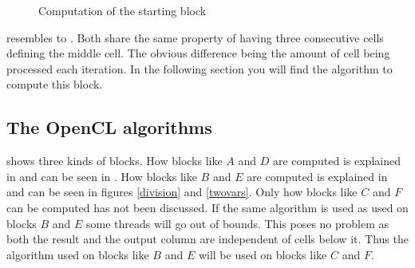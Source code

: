 \begin{figure}
    \centering
    
    \caption{Computation of the starting block} \label{start}
\end{figure}

 resembles to .
Both share the same property of having three consecutive cells defining the middle cell.
The obvious difference being the amount of cell being processed each iteration.
In the following section you will find the algorithm to compute this block.

\subsection{The OpenCL algorithms} \label{algorithms}
 shows three kinds of blocks.
How blocks like $A$ and $D$ are computed is explained in  and can be seen in .
How blocks like $B$ and $E$ are computed is explained in  and can be seen in figures \ref{division} and \ref{twovars}.
Only how blocks like $C$ and $F$ can be computed has not been discussed.
If the same algorithm is used as used on blocks $B$ and $E$ some threads will go out of bounds.
This poses no problem as both the result and the output column are independent of cells below it.
Thus the algorithm used on blocks like $B$ and $E$ will be used on blocks like $C$ and $F$.

